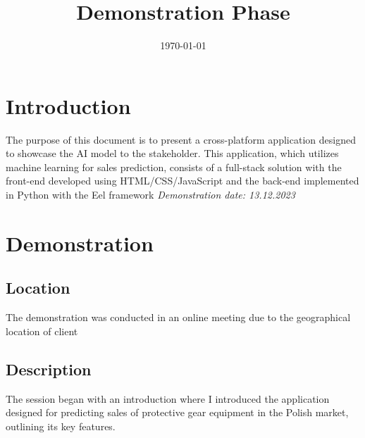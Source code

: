 \documentclass{article}
\begin{document}
\title{Demonstration Phase}
\date{\today}
\maketitle

\newpage
\tableofcontents
\newpage

\section{Introduction}
The purpose of this document is to present a cross-platform application designed to showcase the AI model to the stakeholder. This application, which utilizes machine learning for sales prediction, consists of a full-stack solution with the front-end developed using HTML/CSS/JavaScript and the back-end implemented in Python with the Eel framework
\smallbreak
\textit{Demonstration date: 13.12.2023}
\section{Demonstration}
\subsection{Location}
The demonstration was conducted in an online meeting due to the geographical location of client
\subsection{Description}
The session began with an introduction where I introduced the application designed for predicting sales of protective gear equipment in the Polish market, outlining its key features.
\end{document}
